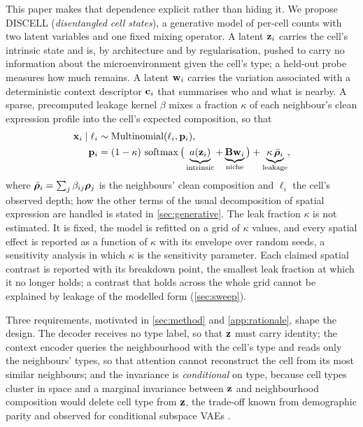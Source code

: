 This paper makes that dependence explicit rather than hiding it. We propose DISCELL (\emph{disentangled cell states}), a generative model of per-cell counts with two latent variables and one fixed mixing operator. A latent $\mathbf{z}_i$ carries the cell's intrinsic state and is, by architecture and by regularisation, pushed to carry no information about the microenvironment given the cell's type; a held-out probe measures how much remains. A latent $\mathbf{w}_i$ carries the variation associated with a deterministic context descriptor $\mathbf{c}_i$ that summarises who and what is nearby. A sparse, precomputed leakage kernel $\beta$ mixes a fraction $\kappa$ of each neighbour's clean expression profile into the cell's expected composition, so that
\begin{equation*}
\begin{aligned}
\mathbf{x}_i \mid \ell_i &\sim \operatorname{Multinomial}(\ell_i, \mathbf{p}_i),\\
\mathbf{p}_i &= (1-\kappa)\,\operatorname{softmax}\big(\underbrace{a(\mathbf{z}_i)}_{\text{intrinsic}} + \underbrace{\mathbf{B}\mathbf{w}_i}_{\text{niche}}\big) + \underbrace{\kappa\,\bar{\boldsymbol{\rho}}_i}_{\text{leakage}},
\end{aligned}
\end{equation*}
where $\bar{\boldsymbol{\rho}}_i = \sum_j \beta_{ij}\boldsymbol{\rho}_j$ is the neighbours' clean composition and $\ell_i$ the cell's observed depth; how the other terms of the usual decomposition of spatial expression are handled is stated in \cref{sec:generative}. The leak fraction $\kappa$ is not estimated. It is fixed, the model is refitted on a grid of $\kappa$ values, and every spatial effect is reported as a function of $\kappa$ with its envelope over random seeds, a sensitivity analysis in which $\kappa$ is the sensitivity parameter. Each claimed spatial contrast is reported with its breakdown point, the smallest leak fraction at which it no longer holds; a contrast that holds across the whole grid cannot be explained by leakage of the modelled form (\cref{sec:sweep}).

Three requirements, motivated in \cref{sec:method} and \cref{app:rationale}, shape the design. The decoder receives no type label, so that $\mathbf{z}$ must carry identity; the context encoder queries the neighbourhood with the cell's type and reads only the neighbours' types, so that attention cannot reconstruct the cell from its most similar neighbours; and the invariance is \emph{conditional} on type, because cell types cluster in space and a marginal invariance between $\mathbf{z}$ and neighbourhood composition would delete cell type from $\mathbf{z}$, the trade-off known from demographic parity \citep{zhao2019inherent} and observed for conditional subspace VAEs \citep{slavutsky2025}.

